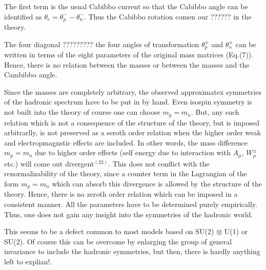 The first term is the usual Cabibbo current so that the Cabibbo angle can be identified as $\theta_{e} = \theta^{-}_{p}-\theta^{-}_{n}$. Thus the Cabibbo rotation comen our ?????? in the theory.

The four diagonal ????????? the four angles of transformation $\theta^{\pm}_{p}$ and $\theta^{\pm}_{n}$ can be written in terms of the eight parameters of the original mass matrices (Eq.(7)). Hence, there is no relation between the masses or between the masses and the Cambibbo angle.

Since the masses are completely arbitrary, the observed approximatex symmetries of the hadronic spectrum have to be put in by hand. Even isospin symmetry is not built into the theory of course one can choose $m_{p} = m_{n}$. But, any such relation which is not a consequence of the structure of the theory, but is imposed arbitrarlly, is not preserved as a seroth order relation when the higher order weak and electropmagnstic effects are included. In other words, the mass difference $m_{p}=m_{n}$ due to higher order effects (self energy due to interaction with $A_{\mu}$, $W^{\pm}_{\mu}$ etc.) will come out divergent$^{(23)}$. This does not conflict with the renormalizability of the theory, since a counter term in the Lagrangian of the form $m_{p}=m_{n}$ which can absorb this divergence is allowed by the structure of the theory. Hence, there is no zeroth order relation which can be imposed in a consistent manner. All the parameters have to be determined purely empirically. Thus, one does not gain any insight into the symmetries of the hadronic world.

This seems to be a defect common to most models based on SU(2) $\otimes$ U(1) or SU(2). Of course this can be overcome by enlarging the group of general invariance to include the hadronic symmetries, but then, there is hardly anything left to explian!.

